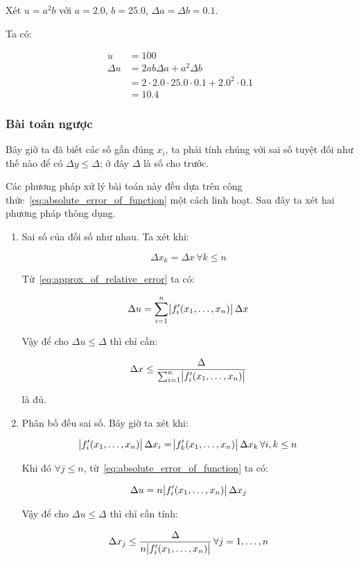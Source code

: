 \documentclass[../../Lectures.tex]{subfiles}
\begin{document}
\begin{exmp}
    Xét \(u = a^2 b\) với \(a = \num{2.0}\), \(b = \num{25.0}\), \(\Delta a =
    \Delta b = \num{0.1}\).

    Ta có:

    \[\begin{aligned}
               u &= 100 \\
        \Delta u &= 2ab \Delta a + a^2 \Delta b \\
                 &= 2 \cdot \num{2.0} \cdot \num{25.0} \cdot \num{0.1} + \num{2.0}^2 \cdot \num{0.1} \\
                 &= \num{10.4}
    \end{aligned}\]
\end{exmp}

\subsubsection{Bài toán ngược}

Bây giờ ta đã biết các số gần đúng \(x_i\), ta phải tính chúng với sai số tuyệt
đối như thế nào để có \(\Delta y \leq \Delta\); ở đây \(\Delta\) là số cho
trước.

Các phương pháp xử lý bài toán này đều dựa trên công thức~\ref{eq:absolute_error_of_function}
một cách linh hoạt. Sau đây ta xét hai phương pháp thông dụng.

\begin{enumerate}
    \item Sai số của  đối số như nhau.
        Ta xét khi:

        \[\Delta x_k = \Delta x \, \forall k \leq n\]

        Từ~\ref{eq:approx_of_relative_error} ta có:

        \[\Delta u = \sum_{i=1}^{n} \abs{f'_i(x_1, \ldots, x_n)} \Delta x\]

        Vậy để cho \(\Delta u \leq \Delta\) thì chỉ cần:

        \begin{equation}\label{eq:same_error}
            \Delta x \leq \frac{\Delta}{\sum_{i=1}^{n} \abs{f'_i(x_1, \ldots, x_n)}}
        \end{equation}

        là đủ.

    \item Phân bố đều sai số.
        Bây giờ ta xét khi:

        \[\abs{f'_i(x_1, \ldots, x_n)} \Delta x_i = \abs{f'_k(x_1, \ldots, x_n)} \Delta x_k \, \forall i, k \leq n\]

        Khi đó \(\forall j \leq n\), từ~\ref{eq:absolute_error_of_function} ta có:

        \[\Delta u = n \abs{f'_i(x_1, \ldots, x_n)} \Delta x_j\]

        Vậy để cho \(\Delta u \leq \Delta\) thì chỉ cần tính:

        \begin{equation}\label{eq:evenly_distributed_error}
            \Delta x_j \leq \frac{\Delta}{n \abs{f'_i(x_1, \ldots, x_n)}} \, \forall j = 1, \ldots, n
        \end{equation}
\end{enumerate}
\end{document}
